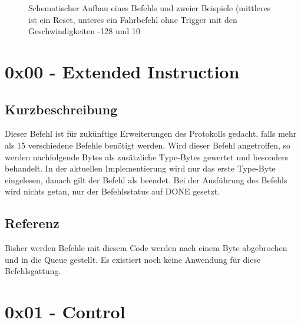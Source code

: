 \documentclass[a4paper]{article}
\begin{document}
	\begin{figure}[!ht]
		\centering
		\caption{Schematischer Aufbau eines Befehls und zweier Beispiele (mittleres ist ein Reset, unteres ein Fahrbefehl ohne
		Trigger mit den Geschwindigkeiten -128 und 10}
	\end{figure}
	\pagebreak


	\section{0x00 - Extended Instruction}

	\subsection{Kurzbeschreibung}

	Dieser Befehl ist für zukünftige Erweiterungen des Protokolls gedacht, falls mehr als 15 verschiedene Befehle
	benötigt werden. Wird dieser Befehl angetroffen, so werden nachfolgende Bytes als zusätzliche Type-Bytes gewertet
	und besonders behandelt.
	In der aktuellen Implementierung wird nur das erste Type-Byte eingelesen, danach gilt der Befehl als beendet. Bei der
	Ausführung des Befehls wird nichts getan, nur der Befehlsstatus auf DONE gesetzt.

	\subsection{Referenz}

	Bisher werden Befehle mit diesem Code werden nach einem Byte abgebrochen und in die Queue gestellt. Es existiert noch
	keine Anwendung für diese Befehlsgattung.
	\pagebreak

	\section{0x01 - Control}
\end{document}
